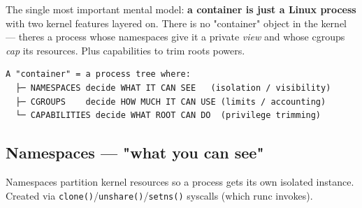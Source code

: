 \documentclass[11pt]{article}
\begin{document}
The single most important mental model: \textbf{a container is just a Linux process} with two kernel features layered on. There is no "container" object in the kernel --- there\textquotesingle s a process whose namespaces give it a private \emph{view} and whose cgroups \emph{cap} its resources. Plus capabilities to trim root\textquotesingle s powers.

\setcodelang{}

\begin{verbatim}
A "container" = a process tree where:
  ├─ NAMESPACES decide WHAT IT CAN SEE   (isolation / visibility)
  ├─ CGROUPS    decide HOW MUCH IT CAN USE (limits / accounting)
  └─ CAPABILITIES decide WHAT ROOT CAN DO  (privilege trimming)
\end{verbatim}

\subsection{Namespaces --- "what you can see"}\label{namespaces--what-you-can-see}

Namespaces partition kernel resources so a process gets its own isolated instance. Created via \texttt{clone()}/\texttt{unshare()}/\texttt{setns()} syscalls (which runc invokes).
\end{document}
